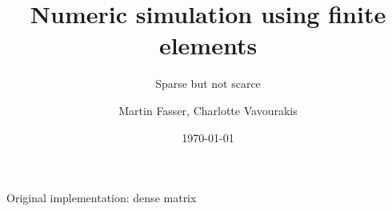 \documentclass[aspectratio=169,xcolor=dvipsnames]{beamer}
\title[short title]{Numeric simulation using finite elements}
\subtitle{Sparse but not scarce}
\author {Martin Fasser, Charlotte Vavourakis}
\institute[UIBK] %
{
    University of Innsbruck
    \vskip 3pt
}
\date{\today} %
\begin{document}
\begin{frame}
    \titlepage
\end{frame}




\begin{frame}{Original implementation: dense matrix}
    \begin{center}
    \end{center}
\end{frame}

\end{document}
